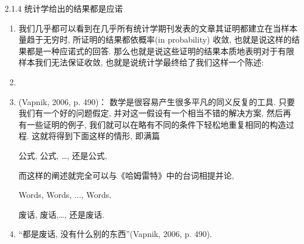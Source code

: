\documentclass[compress,10pt,dvipsnames,notheorems]{beamer} %
\begin{document}
\begin{frame}{2.1.4 统计学给出的结果都是应诺}
\begin{solu}
\begin{enumerate}
\item 我们几乎都可以看到在几乎所有统计学期刊发表的文章其证明都建立在当样本量趋于无穷时, 所证明的结果都依概率(in probability) 收敛, 也就是说这样的结果都是一种应诺式的回答. 那么也就是说这些证明的结果本质地表明对于有限样本我们无法保证收敛, 也就是说统计学最终给了我们这样一个陈述: 
\pause
\item {\color{red}{反复向我们表明, 统计学把自己的无知当良知.}}
\item (Vapnik, 2006, p. 490)： 数学是很容易产生很多平凡的同义反复的工具. 只要我们有一个好的问题假定, 并对这一假设有一个相当不错的解决方案, 然后再
有一些证明的例子, 我们就可以在略有不同的条件下轻松地重复相同的构造过程. 这就将得到下面这样的情形, 即满篇
\begin{center}
公式, 公式, …, 还是公式,
\end{center}
而这样的阐述就完全可以与《哈姆雷特》中的台词相提并论,

\pause
\begin{center}
Words, Words, ..., Words.
\end{center}

\pause
\begin{center}
废话, 废话,…, 还是废话. 
\end{center}
\item “都是废话, 没有什么别的东西”(Vapnik, 2006, p. 490).
\end{enumerate}
\end{solu}
\end{frame}

\begin{frame}


\end{frame}
\end{document}
